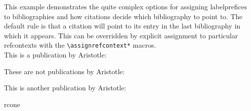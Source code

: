 \documentclass[a4paper]{article}
\newcommand{\cmd}[1]{\texttt{\textbackslash #1}}
\begin{document}
This example demonstrates the quite complex options for assigning
labelprefices to bibliographies and how citations decide which bibliography
to point to. The default rule is that a citation will point to its entry in
the last bibliography in which it appears. This can be overridden by
explicit assignment to particular refcontexts with the
\cmd{assignrefcontext*} macros.\\


This is a publication by Aristotle:
\cite{aristotle:anima} %

These are not publications by Aristotle:
\cite{yoon} %
\cite{worman} %
\cite{piccato} %
\cite{nussbaum} %

This is another publication by Aristotle:
\cite{aristotle:physics} %

\begin{refcontext}{rcone}
\printbibliography[keyword=primary, title={Aristotle Publications}]
\end{refcontext}

\printbibliography[notkeyword=primary, title={Other publications}]
\endrefcontext

\begin{refcontext}[labelprefix=Q]
\printbibliography[filter=cats, title={Other publications}]
\end{refcontext}
\end{document}
